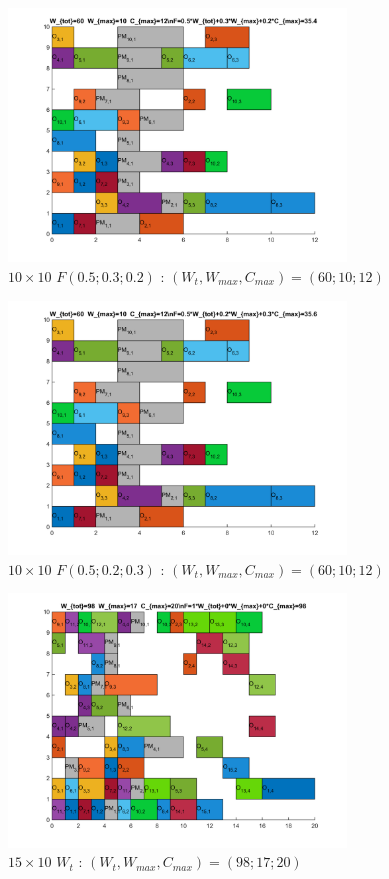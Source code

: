\documentclass[10pt,a4paper]{scrartcl}
\begin{document}
\begin{figure}
  \centering
  \includegraphics[width=0.8\textwidth]{img/results10x10_F050302.png}
  \caption{$10 \times 10$ $F(0.5;0.3;0.2)$ : $(W_t, W_{max}, C_{max}) = (60; 10; 12)$}
\end{figure}
\begin{figure}
  \centering
  \includegraphics[width=0.8\textwidth]{img/results10x10_F050203.png}
  \caption{$10 \times 10$ $F(0.5;0.2;0.3)$ : $(W_t, W_{max}, C_{max}) = (60; 10; 12)$}
\end{figure}
\begin{figure}
  \centering
  \includegraphics[width=0.8\textwidth]{img/results15x10_Wtot.png}
  \caption{$15 \times 10$ $W_{t}$ : $(W_t, W_{max}, C_{max}) = (98; 17; 20)$}
\end{figure}
\end{document}
